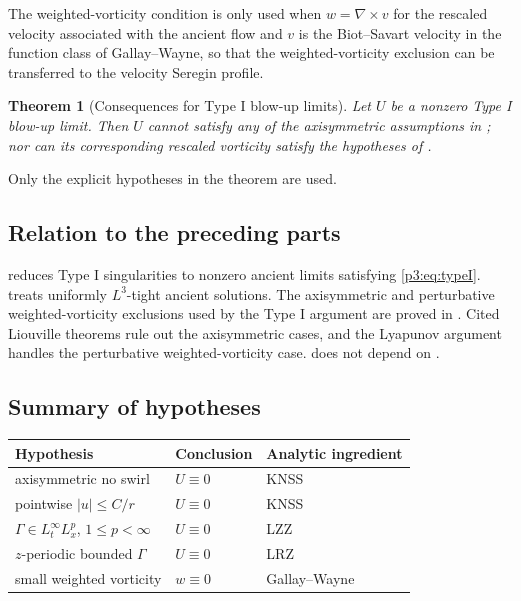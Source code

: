 \documentclass[11pt]{amsart}
\theoremstyle{plain}
\newtheorem{theorem}{Theorem}[section]
\theoremstyle{definition}
\theoremstyle{remark}
\numberwithin{equation}{section}
\begin{document}
The weighted-vorticity condition is only used when \(w=\nabla\times v\) for
the rescaled velocity associated with the ancient flow and \(v\) is the
Biot--Savart velocity in the function class of Gallay--Wayne, so that the
weighted-vorticity exclusion can be transferred to the velocity Seregin
profile.

\begin{theorem}[Consequences for Type I blow-up limits]
\label{p3:thm:typeI-consequences}
Let \(U\) be a nonzero Type I blow-up limit.  Then \(U\) cannot satisfy any of
the axisymmetric assumptions in ; nor can its
corresponding rescaled vorticity satisfy the hypotheses of
.
\end{theorem}

Only the explicit hypotheses in the theorem are used.

\subsection{Relation to the preceding parts}

 reduces Type I singularities to nonzero ancient
limits satisfying \eqref{p3:eq:typeI}.   treats
uniformly \(L^3\)-tight ancient solutions.  The axisymmetric and perturbative
weighted-vorticity exclusions used by the Type I argument are proved in
.  Cited
Liouville theorems rule out the axisymmetric cases, and the Lyapunov argument
handles the perturbative weighted-vorticity case.
 does not depend on
.

\subsection{Summary of hypotheses}

\begin{center}
\begin{tabular}{p{}p{}p{}}
\hline
Hypothesis & Conclusion & Analytic ingredient \\
\hline
axisymmetric no swirl & \(U\equiv0\) & KNSS \\
pointwise \(|u|\le C/r\) & \(U\equiv0\) & KNSS \\
\(\Gamma\in L_t^\infty L_x^p\), \(1\le p<\infty\) & \(U\equiv0\) & LZZ \\
\(z\)-periodic bounded \(\Gamma\) & \(U\equiv0\) & LRZ \\
small weighted vorticity & \(w\equiv0\) & Gallay--Wayne \\
\hline
\end{tabular}
\end{center}
\end{document}
